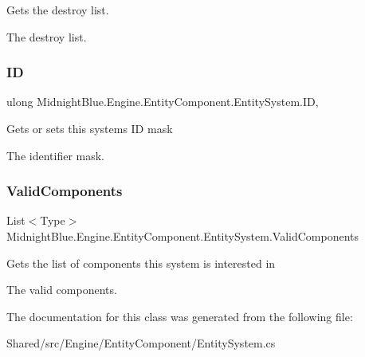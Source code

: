 Gets the destroy list. 

The destroy list.\hypertarget{class_midnight_blue_1_1_engine_1_1_entity_component_1_1_entity_system_ada441a647ad7b51e9a95dbfd1b309271}{}\label{class_midnight_blue_1_1_engine_1_1_entity_component_1_1_entity_system_ada441a647ad7b51e9a95dbfd1b309271} 
\subsubsection{\texorpdfstring{ID}{ID}}
{\footnotesize\ttfamily ulong Midnight\+Blue.\+Engine.\+Entity\+Component.\+Entity\+System.\+ID\hspace{0.3cm}{\ttfamily [get]}, {\ttfamily [set]}}



Gets or sets this systems ID mask 

The identifier mask.\hypertarget{class_midnight_blue_1_1_engine_1_1_entity_component_1_1_entity_system_a2314e0dd40f6a59017ea1446c2d1dae4}{}\label{class_midnight_blue_1_1_engine_1_1_entity_component_1_1_entity_system_a2314e0dd40f6a59017ea1446c2d1dae4} 
\subsubsection{\texorpdfstring{Valid\+Components}{ValidComponents}}
{\footnotesize\ttfamily List$<$Type$>$ Midnight\+Blue.\+Engine.\+Entity\+Component.\+Entity\+System.\+Valid\+Components\hspace{0.3cm}{\ttfamily [get]}}



Gets the list of components this system is interested in 

The valid components.

The documentation for this class was generated from the following file\+:\begin{DoxyCompactItemize}
\item 
Shared/src/\+Engine/\+Entity\+Component/Entity\+System.\+cs\end{DoxyCompactItemize}

